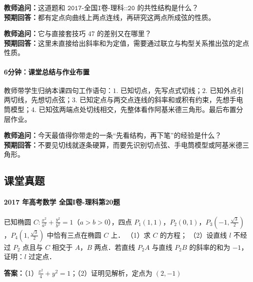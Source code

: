 \documentclass[UTF8,a4paper,11pt]{ctexart}
\begin{document}
\noindent\textbf{教师追问：}这道题和 $\texttt{2017-全国I卷-理科::20}$ 的共性结构是什么？\\

\textbf{预期回答：}都有定点向曲线上两点连线，再研究这两点所成弦的性质。\par

\noindent\textbf{教师追问：}它与直接套技巧 $47$ 的差别又在哪里？\\

\textbf{预期回答：}这里未直接给出斜率和为定值，需要通过联立与构型关系推出弦的定点性质。\par

\paragraph{6分钟：课堂总结与作业布置}

教师带学生归纳本课四句工作语句：$1.$ 已知切点，先写点式切线；$2.$ 已知外点引两切线，先想切点弦；$3.$ 已知定点与两交点连线的斜率和或积有约束，先想手电筒模型；$4.$ 已知弦两端点处切线相交，先整体看作阿基米德三角形。最后布置分层作业。

\noindent\textbf{教师追问：}今天最值得你带走的一条“先看结构，再下笔”的经验是什么？\\

\textbf{预期回答：}不要见切线就逐条硬算，而要先识别切点弦、手电筒模型或阿基米德三角形。\par

\subsection*{课堂真题}

\paragraph{2017 年高考数学 全国I卷-理科第20题}

已知椭圆 $C:\frac{x^2}{a^2}+\frac{y^2}{b^2}=1$（$a>b>0$），四点 $P_1(1,1)$，$P_2(0,1)$，$P_3(-1,\frac{\sqrt{3}}{2})$，$P_4(1,\frac{\sqrt{3}}{2})$ 中恰有三点在椭圆 $C$ 上．
（1）求 $C$ 的方程；
（2）设直线 $l$ 不经过 $P_2$ 点且与 $C$ 相交于 $A$，$B$ 两点．若直线 $P_2A$ 与直线 $P_2B$ 的斜率的和为 $-1$，证明：$l$ 过定点．

\textbf{答案：}（1）$\frac{x^2}{4}+y^2=1$；（2）证明见解析，定点为 $(2,-1)$\par
\end{document}

